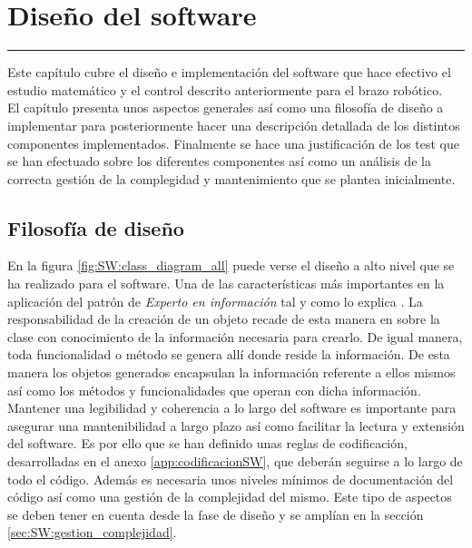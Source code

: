 \chapter{Diseño del software} \label{chap:SW}
\hrule
\vspace{3mm}

Este capítulo cubre el diseño e implementación del software que hace efectivo el estudio matemático y el control descrito anteriormente para el brazo robótico.
\\

El capítulo presenta unos aspectos generales así como una filosofía de diseño a implementar para posteriormente hacer una descripción detallada de los distintos componentes implementados. Finalmente se hace una justificación de los test que se han efectuado sobre los diferentes componentes así como un análisis de la correcta gestión de la complegidad y mantenimiento que se plantea inicialmente.

\section{Filosofía de diseño} \label{sec:SW:filosofia_diseno}

En la figura \ref{fig:SW:class_diagram_all} puede verse el diseño a alto nivel que se ha realizado para el software. Una de las características más importantes en la aplicación del patrón de  \textit{Experto en información} tal y como lo explica \cite{solidgrasp:2012}. La responsabilidad de la creación de un objeto recade de esta manera en sobre la clase con conocimiento de la información necesaria para crearlo. De igual manera, toda funcionalidad o método se genera allí donde reside la información. De esta manera los objetos generados encapsulan la información referente a ellos mismos así como los métodos y funcionalidades que operan con dicha información.
\\

Mantener una legibilidad y coherencia a lo largo del software es importante para asegurar una mantenibilidad a largo plazo así como facilitar la lectura y extensión del software. Es por ello que se han definido unas reglas de codificación, desarrolladas en el anexo \ref{app:codificacionSW}, que deberán seguirse a lo largo de todo el código. Además es necesaria unos niveles mínimos de documentación del código así como una gestión de la complejidad del mismo. Este tipo de aspectos se deben tener en cuenta desde la fase de diseño y se amplían en la sección \ref{sec:SW:gestion_complejidad}.
\\

